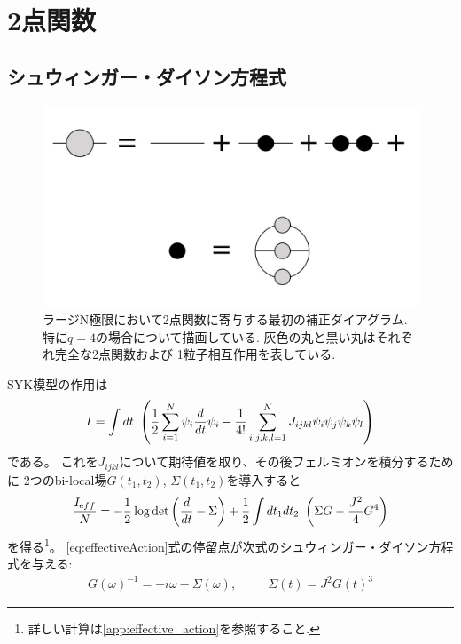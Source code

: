 \section{2点関数\label{sec:twopointfunc}}

\subsection{シュウィンガー・ダイソン方程式}
\begin{figure}[ht]
  \centering
  \includegraphics[width=14cm]{figures/melonDiagram}
  \caption{ラージN極限において2点関数に寄与する最初の補正ダイアグラム.
  特に$q=4$の場合について描画している. 灰色の丸と黒い丸はそれぞれ完全な2点関数および
  1粒子相互作用を表している.}
  \label{fig:melonDiagram}
\end{figure}

SYK模型の作用は
\begin{align}
  I = \int dt\ \left(\frac{1}{2}\sum_{i = 1}^{N} \psi_i \frac{d}{dt} \psi_i
		- \frac{1}{4!} \sum_{i,j,k,l = 1}^{N} J_{ijkl} \psi_i\psi_j\psi_k\psi_l
    \right)
\end{align}
である。
これを$J_{ijkl}$について期待値を取り、その後フェルミオンを積分するために
2つのbi-local場$G(t_1, t_2)$, $\Sigma(t_1, t_2)$を導入すると
\begin{align}
  \frac{I_{\mathrm eff}}{N} =
		- \frac{1}{2}\log\det\left(\frac{d}{dt} - \Sigma\right)
		+ \frac{1}{2}\int dt_1dt_2\ \left(\Sigma G - \frac{J^2}{4}G^4\right)
  \label{eq:effectiveAction}
\end{align}
を得る\footnote{詳しい計算は\ref{app:effective_action}を参照すること.}。
\eqref{eq:effectiveAction}式の停留点が次式のシュウィンガー・ダイソン方程式を与える:
\begin{align}
  G(\omega)^{-1} = -i\omega - \Sigma(\omega),
  \hspace{30pt}
  \Sigma(t) = J^2G(t)^3
  \label{eq:SDeq}
\end{align}

